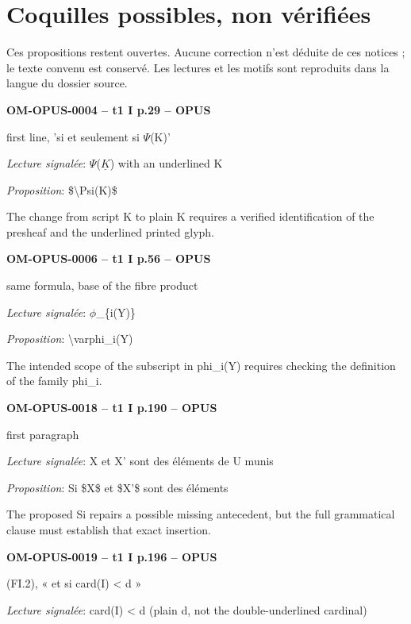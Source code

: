 \chapter*{Coquilles possibles, non vérifiées}
Ces propositions restent ouvertes. Aucune correction n'est déduite de ces notices ; le texte convenu est conservé. Les lectures et les motifs sont reproduits dans la langue du dossier source.
\begingroup\small\raggedright\sloppy\setlength{\parskip}{4pt}
\par\noindent\textbf{OM-OPUS-0004 -- t1 I p.29 -- OPUS}\par
first line, 'si et seulement si \ensuremath{\Psi}(K)'\par
\emph{Lecture signalée}: \ensuremath{\Psi}(\ensuremath{\underline{K}}) with an underlined K\par
\emph{Proposition}: \$\textbackslash{}Psi(K)\$\par
The change from script K to plain K requires a verified identification of the presheaf and the underlined printed glyph.\par
\par\noindent\textbf{OM-OPUS-0006 -- t1 I p.56 -- OPUS}\par
same formula, base of the fibre product\par
\emph{Lecture signalée}: \ensuremath{\phi}\_\{i(Y)\}\par
\emph{Proposition}: \textbackslash{}varphi\_i(Y)\par
The intended scope of the subscript in phi\_i(Y) requires checking the definition of the family phi\_i.\par
\par\noindent\textbf{OM-OPUS-0018 -- t1 I p.190 -- OPUS}\par
first paragraph\par
\emph{Lecture signalée}: X et X' sont des éléments de U munis\par
\emph{Proposition}: Si \$X\$ et \$X'\$ sont des éléments\par
The proposed Si repairs a possible missing antecedent, but the full grammatical clause must establish that exact insertion.\par
\par\noindent\textbf{OM-OPUS-0019 -- t1 I p.196 -- OPUS}\par
(FI.2), « et si card(I) < d »\par
\emph{Lecture signalée}: card(I) < d (plain d, not the double-underlined cardinal)\par
